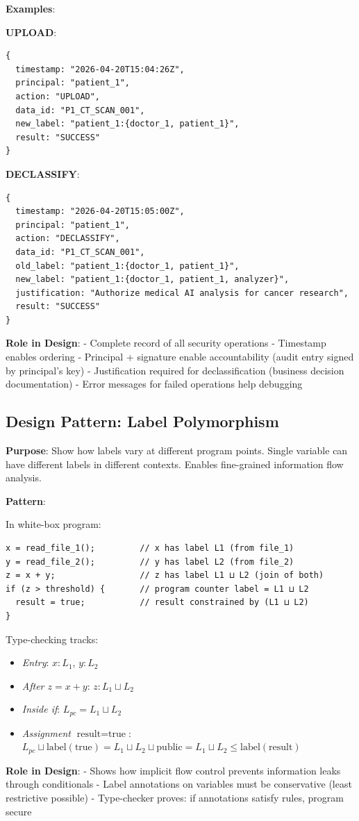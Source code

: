 \textbf{Examples}:

\textbf{UPLOAD}:
\begin{verbatim}
{
  timestamp: "2026-04-20T15:04:26Z",
  principal: "patient_1",
  action: "UPLOAD",
  data_id: "P1_CT_SCAN_001",
  new_label: "patient_1:{doctor_1, patient_1}",
  result: "SUCCESS"
}
\end{verbatim}

\textbf{DECLASSIFY}:
\begin{verbatim}
{
  timestamp: "2026-04-20T15:05:00Z",
  principal: "patient_1",
  action: "DECLASSIFY",
  data_id: "P1_CT_SCAN_001",
  old_label: "patient_1:{doctor_1, patient_1}",
  new_label: "patient_1:{doctor_1, patient_1, analyzer}",
  justification: "Authorize medical AI analysis for cancer research",
  result: "SUCCESS"
}
\end{verbatim}

\textbf{Role in Design}:
- Complete record of all security operations
- Timestamp enables ordering
- Principal + signature enable accountability (audit entry signed by principal's key)
- Justification required for declassification (business decision documentation)
- Error messages for failed operations help debugging

\subsection{Design Pattern: Label Polymorphism}

\textbf{Purpose}: Show how labels vary at different program points. Single variable can have different labels in different contexts. Enables fine-grained information flow analysis.

\textbf{Pattern}:

In white-box program:
\begin{verbatim}
x = read_file_1();         // x has label L1 (from file_1)
y = read_file_2();         // y has label L2 (from file_2)
z = x + y;                 // z has label L1 ⊔ L2 (join of both)
if (z > threshold) {       // program counter label = L1 ⊔ L2
  result = true;           // result constrained by (L1 ⊔ L2)
}
\end{verbatim}

Type-checking tracks:
\begin{itemize}
\item \textit{Entry}: $x: L_1$, $y: L_2$
\item \textit{After $z = x + y$}: $z: L_1 \sqcup L_2$
\item \textit{Inside if}: $L_{pc} = L_1 \sqcup L_2$
\item \textit{Assignment $\text{result} = \text{true}$}: $L_{pc} \sqcup \text{label}(\text{true}) = L_1 \sqcup L_2 \sqcup \text{public} = L_1 \sqcup L_2 \leq \text{label}(\text{result})$
\end{itemize}

\textbf{Role in Design}:
- Shows how implicit flow control prevents information leaks through conditionals
- Label annotations on variables must be conservative (least restrictive possible)
- Type-checker proves: if annotations satisfy rules, program secure


